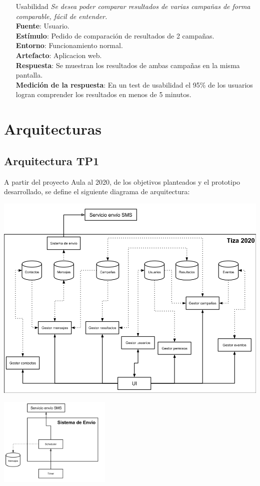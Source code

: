 \documentclass[a4paper, 11pt]{article}
\begin{document}
\begin{itemize}
\item[Usabilidad] \textit{Se desea poder comparar resultados de varias campa\~nas de forma comparable, fácil de entender.} \\
\textbf{Fuente}: Usuario. \\
\textbf{Estímulo}: Pedido de comparación de resultados de 2 campa\~nas. \\
\textbf{Entorno}: Funcionamiento normal. \\
\textbf{Artefacto}: Aplicacion web. \\
\textbf{Respuesta}: Se muestran los resultados de ambas campa\~nas en la misma pantalla. \\
\textbf{Medición de la respuesta}: En un test de usabilidad el 95\% de los usuarios logran comprender los resultados en menos de 5 minutos. \\

\end{itemize}

\newpage

\section{Arquitecturas}
\subsection{Arquitectura TP1}
A partir del proyecto Aula al 2020, de los objetivos planteados y el prototipo desarrollado, se define el siguiente diagrama de arquitectura:

\centerline{\includegraphics[width=1\textwidth]{./diagramas/ArquitecturaTP1.png}}
\centerline{\includegraphics[width=0.4\textwidth]{./diagramas/ArqTP1SistEnvio.png}}
\end{document}
